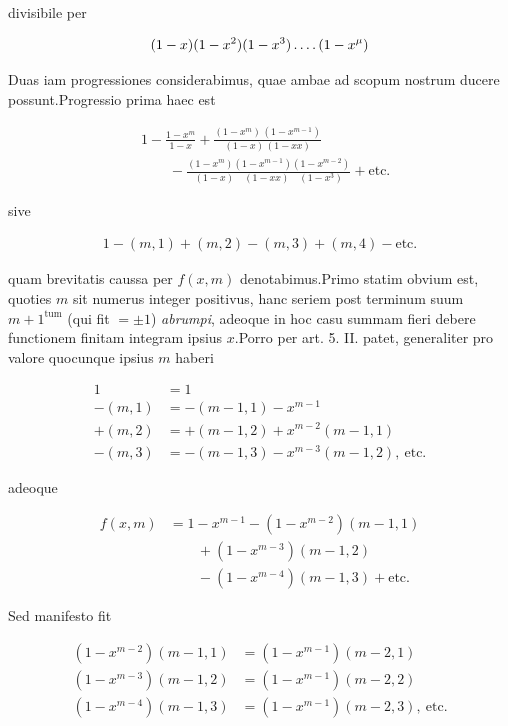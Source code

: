 divisibile per

\[
\begin{aligned}
(1-x)(1-x^2)(1-x^3)\mathinner{.\,.\,.\,.}(1-x^\mu)
\end{aligned}
\]


Duas iam progressiones considerabimus, quae ambae ad scopum nostrum ducere possunt.\quad Progressio prima haec est

%
\[
\begin{aligned}
&1-\frac{1-x^m}{1-x}+\frac{(1-x^m)\,(1-x^{m-1})}{(1-x)\,(1-xx)}\\
&\qquad-\frac{(1-x^m)(1-x^{m-1})(1-x^{m-2})}{(1-x)\quad(1-xx)\quad(1-x^3)}+\text{etc.}
\end{aligned}
\]

sive

\[
\begin{aligned}
1-(m,1)+(m,2)-(m,3)+(m,4)-\text{etc.}
\end{aligned}
\]

quam brevitatis caussa per $f(x,m)$ denotabimus.\quad Primo statim obvium est, quoties $m$ sit numerus integer positivus, hanc seriem post terminum suum $m+1^{\mathrm{tum}}$ (qui fit $=\pm1$) \emph{abrumpi}, adeoque in hoc casu summam fieri debere functionem finitam integram ipsius $x$.\quad Porro per art. 5. II. patet, generaliter pro valore quocunque ipsius $m$ haberi

\[
\begin{aligned}
1&=1\\
-(m,1)&=-(m-1,1)-x^{m-1}\\
+(m,2)&=+(m-1,2)+x^{m-2}(m-1,1)\\
-(m,3)&=-(m-1,3)-x^{m-3}(m-1,2),\ \text{etc.}
\end{aligned}
\]

adeoque

\[
\begin{aligned}
f(x,m)&=1-x^{m-1}-(1-x^{m-2})(m-1,1)\\
&\qquad+(1-x^{m-3})(m-1,2)\\
&\qquad-(1-x^{m-4})(m-1,3)+\text{etc.}
\end{aligned}
\]

Sed manifesto fit

\[
\begin{aligned}
(1-x^{m-2})(m-1,1)&=(1-x^{m-1})(m-2,1)\\
(1-x^{m-3})(m-1,2)&=(1-x^{m-1})(m-2,2)\\
(1-x^{m-4})(m-1,3)&=(1-x^{m-1})(m-2,3),\ \text{etc.}
\end{aligned}
\]

